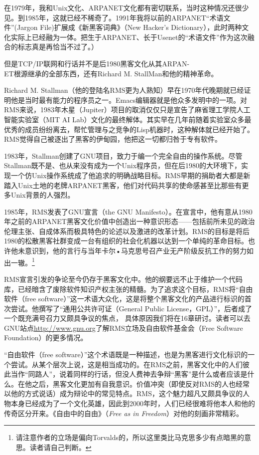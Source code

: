 \documentclass[12pt,oneside]{book}
\begin{document}
在1979年，我和Unix文化、ARPANET文化都有密切联系，当时这种情况还很少见。到1985年，这就已经不稀奇了。1991年我将以前的ARPANET“术语文件”(Jargon File)扩展成《新黑客词典》（New Hacker's Dictionary）\cite{Raymond96}，此时两种文化实际上已经融为一体。把生于ARPANET、长于Usenet的“术语文件”作为这次融合的标志真是再恰当不过了。）

但是TCP/IP联网和行话并不是后1980黑客文化从其ARPAN-\\ET根源继承的全部东西，还有Richard M. StallMan和他的精神革命。

Richard M. Stallman（他的登陆名RMS更为人熟知）早在1970年代晚期就已经证明他是当时最有能力的程序员之一。Emacs编辑器就是他众多发明中的一项。对RMS来说，1983年木星（Jupiter）项目的取消仅仅只是宣告了麻省理工学院人工智能实验室（MIT AI Lab）文化的最终解体。其实早在几年前随着实验室众多最优秀的成员纷纷离去，帮忙管理与之竞争的Lisp机器时，这种解体就已经开始了。RMS觉得自己被逐出了黑客的伊甸园，他把这一切都归咎于专有软件。

1983年，Stallman创建了GNU项目，致力于编一个完全自由的操作系统。尽管Stallman既不是、也从来没有成为一个Unix程序员，但在后1980的大环境下，实现一个仿Unix操作系统成了他追求的明确战略目标。RMS早期的捐助者大都是新踏入Unix土地的老牌ARPANET黑客，他们对代码共享的使命感甚至比那些有更多Unix背景的人强烈。

1985年，RMS发表了GNU宣言（the GNU Manifesto）。在宣言中，他有意从1980年之前的ARPANET黑客文化价值中创造出一种意识形态——包括前所未见的政治伦理主张、自成体系而极具特色的论述以及激进的改革计划。RMS的目标是将后1980的松散黑客社群变成一台有组织的社会化机器以达到一个单纯的革命目标。也许他未意识到，他的言行与当年卡尔•马克思号召产业无产阶级反抗工作的努力如出一辙。\footnote{请注意作者的立场是偏向Torvalds的，所以这里类比马克思多少有点暗黑的意思。读者请自己判断。}

RMS宣言引发的争论至今仍存于黑客文化中。他的纲要远不止于维护一个代码库，已经暗含了废除软件知识产权主张的精髓。为了追求这个目标，RMS将“自由软件（free software）”这一术语大众化，这是将整个黑客文化的产品进行标识的首次尝试。他撰写了“通用公共许可证（General Public License，GPL）”，后者成了一个既充满号召力又颇具争议的焦点，  具体原因我们将在16章研讨。读者可以去GNU站点\href{http://www.gnu.org}{http://www.gnu.org}了解RMS立场及自由软件基金会（Free Software Foundation）的更多情况。

“自由软件（free  software）”这个术语既是一种描述，也是为黑客进行文化标识的一个尝试。从某个层次上说，这是相当成功的。在RMS之前，黑客文化中的人们彼此当作“同路人”，说着同样的行话，但没人费神去争辩“黑客”是什么或者应该是什么。在他之后，黑客文化更加有自我意识。价值冲突（即使反对RMS的人也经常以他的方式说话）成为辩论中的常见特点。RMS，这个魅力超凡又颇具争议的人物本身已经成为了一个文化英雄，因此到2000年时，人们已经很难将他本人和他的传奇区分开来。《自由中的自由》（\textit{Free as in Freedom}）\cite{Williams}对他的刻画非常精彩。
\end{document}
